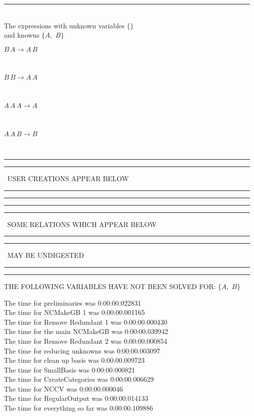 \documentclass[rep10,leqno]{report}
\begin{document}
\rule[3pt]{6in}{.7pt}\\
The expressions with unknown variables $\{\}$\\
and knowns $\{A,
$ $
B\}$\smallskip\\
\begin{minipage}{6in}
$
B\,
 A\rightarrow A\,
 B
$
\end{minipage}\medskip \\
\begin{minipage}{6in}
$
B\,
 B\rightarrow A\,
 A
$
\end{minipage}\medskip \\
\begin{minipage}{6in}
$
A\,
 A\,
 A\rightarrow A
$
\end{minipage}\medskip \\
\begin{minipage}{6in}
$
A\,
 A\,
 B\rightarrow B
$
\end{minipage}\\
\rule[2pt]{6in}{1pt}\hfil\break
\rule[2.5pt]{1.701in}{1pt}
\ USER CREATIONS APPEAR BELOW\ 
\rule[2.5pt]{1.701in}{1pt}\hfil\break
\rule[2pt]{6in}{1pt}\hfil\break
\rule[2pt]{6in}{4pt}\hfil\break
\rule[2pt]{1.45in}{4pt}
\ SOME RELATIONS WHICH APPEAR BELOW\ 
\rule[2pt]{1.45in}{4pt}\hfil\break
\rule[2pt]{2.18in}{4pt}
\ MAY BE UNDIGESTED\ 
\rule[2pt]{2.18in}{4pt}\hfil\break
\rule[2pt]{6in}{4pt}\hfil\break
THE FOLLOWING VARIABLES HAVE NOT BEEN SOLVED FOR:\hfil\break
$\{A,
$ $
B\}$
\smallskip\\
\vspace{10pt}

\noindent
The time for preliminaries was 0:00:00.022831\\
The time for NCMakeGB 1 was 0:00:00.001165\\
The time for Remove Redundant 1 was 0:00:00.000430\\
The time for the main NCMakeGB was 0:00:00.039942\\
The time for Remove Redundant 2 was 0:00:00.000854\\
The time for reducing unknowns was 0:00:00.003097\\
The time for clean up basis was 0:00:00.009723\\
The time for SmallBasis was 0:00:00.000821\\
The time for CreateCategories was 0:00:00.006629\\
The time for NCCV was 0:00:00.000046\\
The time for RegularOutput was 0:00:00.014133\\
The time for everything so far was 0:00:00.109886\\
\end{document}
